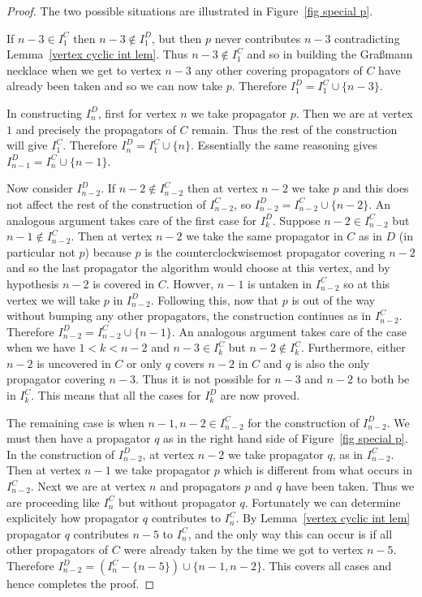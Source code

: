 \documentclass[11pt]{article}
\theoremstyle{remark}
\theoremstyle{definition}
\begin{document}
\begin{proof}
  The two possible situations are illustrated in Figure~\ref{fig special p}.

  If $n-3\in I_1^{C}$ then $n-3\not\in I_1^{D}$, but then $p$ never contributes $n-3$ contradicting Lemma~\ref{vertex cyclic int lem}.  Thus $n-3\not\in I_1^{C}$ and so in building the Gra\ss mann necklace when we get to vertex $n-3$ any other covering propagators of $C$ have already been taken and so we can now take $p$.  Therefore $I_1^{D}= I_1^{C}\cup \{n-3\}$.

  In constructing $I_n^{D}$, first for vertex $n$ we take propagator $p$.  Then we are at vertex $1$ and precisely the propagators of $C$ remain.  Thus the rest of the construction will give $I_1^{C}$.  Therefore $I_n^{D} = I_1^{C}\cup \{n\}$.  Essentially the same reasoning gives $I_{n-1}^{D} = I_n^{C}\cup \{n-1\}$.

  Now consider $I_{n-2}^{D}$.  If $n-2\not\in I_{n-2}^{C}$ then at vertex $n-2$ we take $p$ and this does not affect the rest of the construction of $I_{n-2}^{C}$, so $I_{n-2}^{D} = I_{n-2}^{C}\cup \{n-2\}$.  An analogous argument takes care of the first case for $I_k^{D}$.  Suppose $n-2\in I_{n-2}^{C}$ but $n-1\not\in I_{n-2}^{C}$.  Then at vertex $n-2$ we take the same propagator in $C$ as in $D$ (in particular not $p$) because $p$ is the counterclockwisemost propagator covering $n-2$ and so the last propagator the algorithm would choose at this vertex, and by hypothesis $n-2$ is covered in $C$.  Howver, $n-1$ is untaken in $I_{n-2}^{C}$ so at this vertex we will take $p$ in $I_{n-2}^{D}$.  Following this, now that $p$ is out of the way without bumping any other propagators, the construction continues as in $I_{n-2}^{C}$.  Therefore $I_{n-2}^{D} = I_{n-2}^{C}\cup \{n-1\}$.  An analogous argument takes care of the case when we have $1<k<n-2$ and $n-3\in I_k^{C}$ but $n-2\not\in I_{k}^{C}$.  Furthermore, either $n-2$ is uncovered in $C$ or only $q$ covers $n-2$ in $C$ and $q$ is also the only propagator covering $n-3$.  Thus it is not possible for $n-3$ and $n-2$ to both be in $I_{k}^{C}$.  This means that all the cases for $I_k^{D}$ are now proved.

  The remaining case is when $n-1,n-2\in I_{n-2}^{C}$ for the construction of $I_{n-2}^{D}$.  We must then have a propagator $q$ as in the right hand side of Figure~\ref{fig special p}.  In the construction of $I_{n-2}^{D}$, at vertex $n-2$ we take propagator $q$, as in $I_{n-2}^{C}$.  Then at vertex $n-1$ we take propagator $p$ which is different from what occurs in $I_{n-2}^{C}$.  Next we are at vertex $n$ and propagators $p$ and $q$ have been taken.  Thus we are proceeding like $I_{n}^{C}$ but without propagator $q$.  Fortunately we can determine explicitely how propagator $q$ contributes to $I_{n}^{C}$.  By Lemma~\ref{vertex cyclic int lem} propagator $q$ contributes $n-5$ to $I_{n}^{C}$, and the only way this can occur is if all other propagators of $C$ were already taken by the time we got to vertex $n-5$.  Therefore $I_{n-2}^{D} = (I_{n}^{C} - \{n-5\}) \cup \{n-1, n-2\}$.  This covers all cases and hence completes the proof.
\end{proof}
\end{document}
